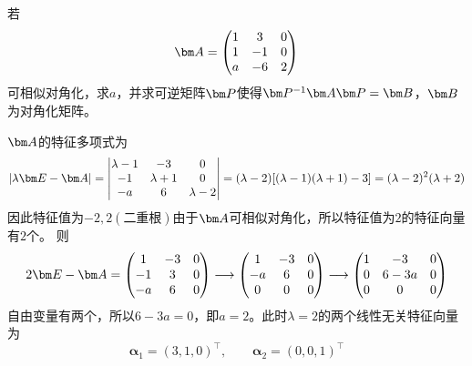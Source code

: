 \begin{example}
    若
    \[
        \mat{A} =
        \begin{pmatrix}
            1 & 3  & 0 \\
            1 & -1 & 0 \\
            a & -6 & 2
        \end{pmatrix}
    \]
    可相似对角化，求$a$，并求可逆矩阵$\mat{P}$使得$\mat{P}^{-1}\mat{A}\mat{P}=\mat{B}$，$\mat{B}$为对角化矩阵。
\end{example}
\begin{solution}
    $\mat{A}$的特征多项式为
    \[
        |\lambda \mat{E}-\mat{A}| =
        \begin{vmatrix}
            \lambda-1 & -3        & 0         \\
            -1        & \lambda+1 & 0         \\
            -a        & 6         & \lambda-2
        \end{vmatrix}
        =(\lambda-2)[(\lambda-1)(\lambda+1)-3]
        =(\lambda-2)^2(\lambda+2)
    \]
    因此特征值为$-2,2(\text{二重根})$由于$\mat{A}$可相似对角化，所以特征值为$2$的特征向量有$2$个。
    则
    \[
        2\mat{E}-\mat{A} =
        \begin{pmatrix}
            1  & -3 & 0 \\
            -1 & 3  & 0 \\
            -a & 6  & 0
        \end{pmatrix}
        \longrightarrow
        \begin{pmatrix}
            1  & -3 & 0 \\
            -a & 6  & 0 \\
            0  & 0  & 0
        \end{pmatrix}
        \longrightarrow
        \begin{pmatrix}
            1 & -3   & 0 \\
            0 & 6-3a & 0 \\
            0 & 0    & 0
        \end{pmatrix}
    \]
    自由变量有两个，所以$6-3a=0$，即$a=2$。此时$\lambda=2$的两个线性无关特征向量为
    \[ \bm{\alpha}_1 = (3,1,0)^\intercal ,\qquad \bm{\alpha}_2 = (0,0,1)^\intercal \]


\end{solution}
